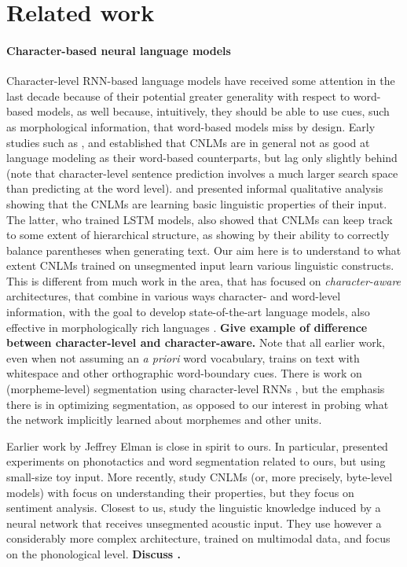 \section{Related work}
\label{sec:related}

\paragraph{Character-based neural language models} Character-level
RNN-based language models have received some attention in the last
decade because of their potential greater generality with respect to
word-based models, as well because, intuitively, they should be able
to use cues, such as morphological information, that word-based models
miss by design. Early studies such as ,
 and  established
that CNLMs are in general not as good at language modeling as their
word-based counterparts, but lag only slightly behind (note that
character-level sentence prediction involves a much larger search
space than predicting at the word
level).  and 
presented informal qualitative analysis showing that the CNLMs are
learning basic linguistic properties of their input. The latter, who
trained LSTM models, also showed that CNLMs can keep track to some
extent of hierarchical structure, as showing by their ability to
correctly balance parentheses when generating text. Our aim here is to
understand to what extent CNLMs trained on unsegmented input learn
various linguistic constructs. This is different from much work in the
area, that has focused on \emph{character-aware} architectures, that
combine in various ways character- and word-level information, with
the goal to develop state-of-the-art language models, also effective
in morphologically rich languages \citep[see, e.g.,][and references
there]{Bojanowski:etal:2016,Kim:etal:2016,Gerz:etal:2018}. \textbf{Give
  example of difference between character-level and character-aware.}
Note that all earlier work, even when not assuming an \emph{a priori}
word vocabulary, trains on text with whitespace and other orthographic
word-boundary cues. There is work on (morpheme-level) segmentation
using character-level RNNs \cite{Kann:etal:2016}, but the emphasis
there is in optimizing segmentation, as opposed to our interest in
probing what the network implicitly learned about morphemes and other
units.


Earlier work by Jeffrey Elman is close in spirit to ours. In
particular,  presented experiments on phonotactics
and word segmentation related to ours, but using small-size toy
input. More recently, \cite{Radford:etal:2017} study CNLMs (or, more
precisely, byte-level models) with focus on understanding their
properties, but they focus on sentiment analysis. Closest to us,
\cite{Alishahi:etal:2017} study the linguistic knowledge induced by a
neural network that receives unsegmented acoustic input. They use
however a considerably more complex architecture, trained on
multimodal data, and focus on the phonological level. \textbf{Discuss
.}

